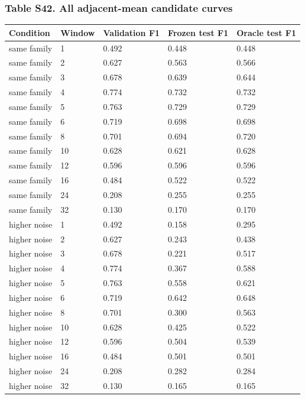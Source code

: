 \documentclass[a4paper,11pt]{article}
\newcounter{none}
\begin{document}
\subsubsection{Table S42. All adjacent-mean candidate curves}\label{table-s42.-all-adjacent-mean-candidate-curves}

{\def\LTcaptype{none} %
\begin{longtable}[]{@{}lllll@{}}
\toprule\noalign{}
Condition & Window & Validation F1 & Frozen test F1 & Oracle test F1 \\
\midrule\noalign{}
\endhead
\bottomrule\noalign{}
\endlastfoot
same family & 1 & 0.492 & 0.448 & 0.448 \\
same family & 2 & 0.627 & 0.563 & 0.566 \\
same family & 3 & 0.678 & 0.639 & 0.644 \\
same family & 4 & 0.774 & 0.732 & 0.732 \\
same family & 5 & 0.763 & 0.729 & 0.729 \\
same family & 6 & 0.719 & 0.698 & 0.698 \\
same family & 8 & 0.701 & 0.694 & 0.720 \\
same family & 10 & 0.628 & 0.621 & 0.628 \\
same family & 12 & 0.596 & 0.596 & 0.596 \\
same family & 16 & 0.484 & 0.522 & 0.522 \\
same family & 24 & 0.208 & 0.255 & 0.255 \\
same family & 32 & 0.130 & 0.170 & 0.170 \\
higher noise & 1 & 0.492 & 0.158 & 0.295 \\
higher noise & 2 & 0.627 & 0.243 & 0.438 \\
higher noise & 3 & 0.678 & 0.221 & 0.517 \\
higher noise & 4 & 0.774 & 0.367 & 0.588 \\
higher noise & 5 & 0.763 & 0.558 & 0.621 \\
higher noise & 6 & 0.719 & 0.642 & 0.648 \\
higher noise & 8 & 0.701 & 0.300 & 0.563 \\
higher noise & 10 & 0.628 & 0.425 & 0.522 \\
higher noise & 12 & 0.596 & 0.504 & 0.539 \\
higher noise & 16 & 0.484 & 0.501 & 0.501 \\
higher noise & 24 & 0.208 & 0.282 & 0.284 \\
higher noise & 32 & 0.130 & 0.165 & 0.165 \\
\end{longtable}
}
\end{document}
